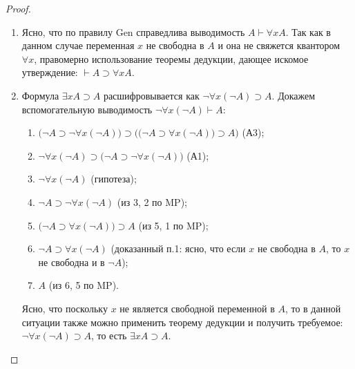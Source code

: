 \begin{proof}\leavevmode
    \begin{enumerate}[label=\arabic*)]
        \item Ясно, что по правилу Gen справедлива выводимость $A \vdash \forall xA$. Так как в данном случае переменная $x$ не свободна в $A$ и она не свяжется квантором $\forall x$, правомерно использование теоремы дедукции, дающее искомое утверждение: $\vdash A \supset \forall xA$.

        \item Формула $\exists xA \supset A$ расшифровывается как $\neg\forall x(\neg A) \supset A$. Докажем вспомогательную выводимость $\neg\forall x(\neg A) \vdash A$:
        \begin{enumerate}[label=\arabic*.]
            \item $\big(\neg A \supset \neg\forall x(\neg A)\big) \supset \Big(\big(\neg A \supset \forall x(\neg A)\big) \supset A\Big)$ (А3);
            \item $\neg\forall x(\neg A) \supset \big(\neg A \supset \neg\forall x(\neg A)\big)$ (А1);
            \item $\neg\forall x(\neg A)$ (гипотеза);
            \item $\neg A \supset \neg\forall x(\neg A)$ (из 3, 2 по MP);
            \item $\big(\neg A \supset \forall x(\neg A)\big) \supset A$ (из 5, 1 по MP);
            \item $\neg A \supset \forall x(\neg A)$ (доказанный п.1: ясно, что если $x$ не свободна в $A$, то $x$ не свободна и в $\neg A$);
            \item $A$ (из 6, 5 по MP).
        \end{enumerate}
        Ясно, что поскольку $x$ не является свободной переменной в $A$, то в данной ситуации также можно применить теорему дедукции и получить требуемое: $\neg\forall x(\neg A) \supset A$, то есть $\exists xA \supset A$.


\end{enumerate}
\end{proof}
